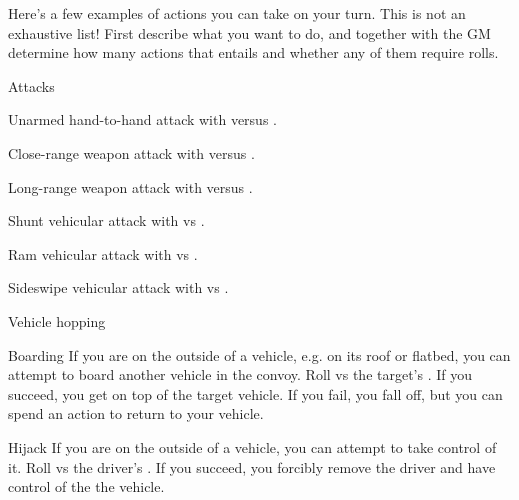 
Here's a few examples of actions you can take on your turn. This is not an exhaustive list! First describe what you want to do, and together with the GM determine how many actions that entails and whether any of them require rolls.

\begin{abstractsection}{Attacks}
\vspace{1ex}

\begin{describe}{Unarmed hand-to-hand}
  attack with  versus .
\end{describe}

\begin{describe}{Close-range weapon}
  attack with  versus .
\end{describe}

\begin{describe}{Long-range weapon}
  attack with  versus .
\end{describe}

\begin{describe}{Shunt}
  vehicular attack with  vs .
\end{describe}

\begin{describe}{Ram}
  vehicular attack with  vs .
\end{describe}

\begin{describe}{Sideswipe}
  vehicular attack with  vs .
\end{describe}
\end{abstractsection}

\begin{abstractsection}{Vehicle hopping}
\vspace{1ex}
\begin{describe}{Boarding}
  If you are on the outside of a vehicle, e.g. on its roof or flatbed, you can attempt to board another vehicle in the convoy. Roll  vs the target's . If you succeed, you get on top of the target vehicle. If you fail, you fall off, but you can spend an action to return to your vehicle.
\end{describe}

\begin{describe}{Hijack}
  If you are on the outside of a vehicle, you can attempt to take control of it. Roll  vs the driver's . If you succeed, you forcibly remove the driver and have control of the the vehicle.
\end{describe}
\end{abstractsection}

